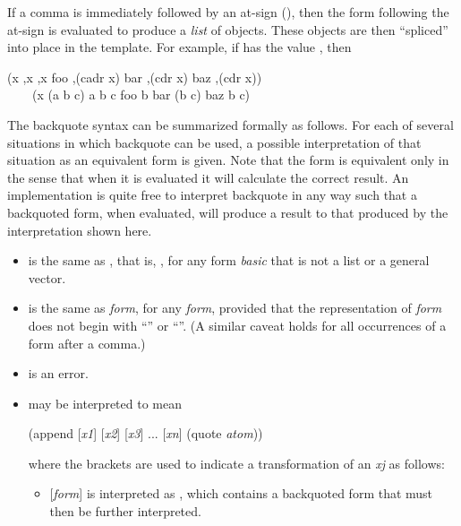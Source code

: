 \begin{flushdesc}
If a comma is immediately followed by an at-sign (\cd{{\Xatsign}}), then the
form following the at-sign is evaluated to produce a \emph{list} of objects.
These objects are then ``spliced'' into place in the template.  For
example, if  has the value , then
\begin{lisp}
{\Xbq}(x ,x ,{\Xatsign}x foo ,(cadr x) bar ,(cdr x) baz ,{\Xatsign}(cdr x)) \\
~~~\EV\ (x (a b c) a b c foo b bar (b c) baz b c)
\end{lisp}

The backquote syntax can be summarized formally as follows.
For each of several situations in which backquote can be used,
a possible interpretation of that situation as an equivalent form
is given.  Note that the form is equivalent only
in the sense that when it is evaluated it will calculate the
correct result.
An implementation is quite free to interpret backquote in any way
such that a backquoted form, when evaluated, will produce a result
 to that produced by the interpretation shown here.
\begin{itemize}
\item
{} is the same as ,
that is, , for any form \emph{basic} that is not a
list or a general vector.

\item
{} is the same as \emph{form}, for any \emph{form}, provided
that the representation of \emph{form} does not begin with ``\cd{{\Xatsign}}''
or ``''.  (A similar caveat holds for all occurrences of a form
after a comma.)

\item
{} is an error.

\item
{} may be interpreted to mean
\begin{lisp}
(append {\rm [}\emph{x1}{\rm ]} {\rm [}\emph{x2}{\rm ]}
    {\rm [}\emph{x3}{\rm ]} ... {\rm [}\emph{xn}{\rm ]} (quote \emph{atom}))
\end{lisp}
where the brackets are used to indicate
a transformation of an \emph{xj} as follows:
\begin{itemize}
\item
{\rm [}\emph{form}{\rm ]} is interpreted as , which
contains a backquoted form that must then be further interpreted.


\end{itemize}
\end{itemize}
\end{flushdesc}
